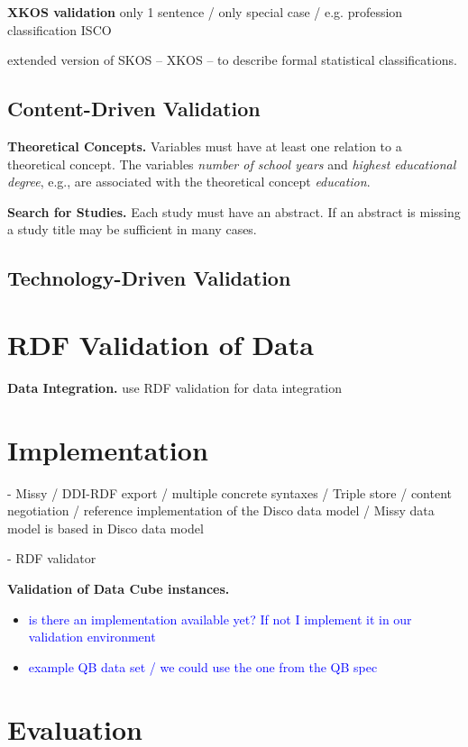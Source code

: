 \documentclass{llncs}
\begin{document}
\textbf{XKOS validation}
only 1 sentence / only special case / e.g. profession classification ISCO

extended version of SKOS – XKOS – to describe formal statistical classifications.

\subsection{Content-Driven Validation}

\textbf{Theoretical Concepts.}
Variables must have at least one relation to a theoretical concept.
The variables \emph{number of school years} and \emph{highest educational degree}, e.g., are associated with the theoretical concept \emph{education}. 

\textbf{Search for Studies.}
Each study must have an abstract. 
If an abstract is missing a study title may be sufficient in many cases.

\subsection{Technology-Driven Validation}

\section{RDF Validation of Data}

\textbf{Data Integration.}
use RDF validation for data integration

\section{Implementation}

- Missy / DDI-RDF export / multiple concrete syntaxes / Triple store / content negotiation / reference implementation of the Disco data model / Missy data model is based in Disco data model

- RDF validator

\textbf{Validation of Data Cube instances.}
\begin{itemize}
	\item \textcolor{blue}{is there an implementation available yet? If not I implement it in our validation environment}
	\item \textcolor{blue}{example QB data set / we could use the one from the QB spec}
\end{itemize}

\section{Evaluation}
\end{document}
